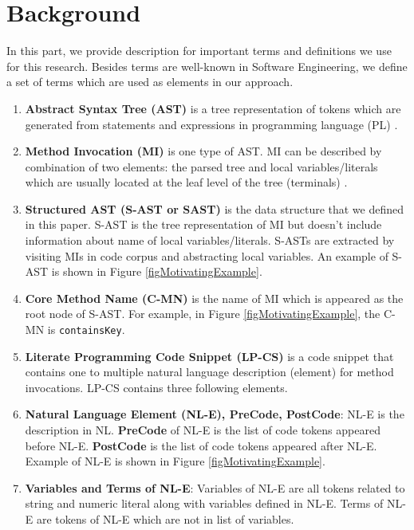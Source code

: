 \section{Background}
In this part, we provide description for important terms and definitions we use for this research. Besides terms are well-known in Software Engineering, we define a set of terms which are used as elements in our approach.

\begin{enumerate}[\indent {}]
        \item \textbf{Abstract Syntax Tree (AST)} is a tree representation of tokens which are generated from statements and expressions in programming language (PL) \cite{011}.
        \item \textbf{Method Invocation (MI)} is one type of AST. MI can be described by combination of two elements: the parsed tree and local variables/literals which are usually located at the leaf level of the tree (terminals) \cite{012}. 
        \item \textbf{Structured AST (S-AST or SAST)} is the data structure that we defined in this paper. S-AST is the tree representation of MI but doesn't include information about name of local variables/literals. S-ASTs are extracted by visiting MIs in code corpus and abstracting local variables. An example of S-AST is shown in Figure \ref{figMotivatingExample}.
        \item \textbf{Core Method Name (C-MN)} is the name of MI which is appeared as the root node of S-AST. For example, in Figure \ref{figMotivatingExample}, the C-MN is \texttt{containsKey}. 
        \item \textbf{Literate Programming Code Snippet (LP-CS)} is a code snippet that contains one to multiple natural language description (element) for method invocations. LP-CS contains three following elements.
        \item \textbf{Natural Language Element (NL-E), PreCode, PostCode}: NL-E is the description in NL. \textbf{PreCode} of NL-E is the list of code tokens appeared before NL-E. \textbf{PostCode} is the list of code tokens appeared after NL-E. Example of NL-E is shown in Figure \ref{figMotivatingExample}.
        
        \item \textbf{Variables and Terms of NL-E}: Variables of NL-E are all tokens related to string and numeric literal along with variables defined in NL-E. Terms of NL-E are tokens of NL-E which are not in list of variables. 
    \end{enumerate}
